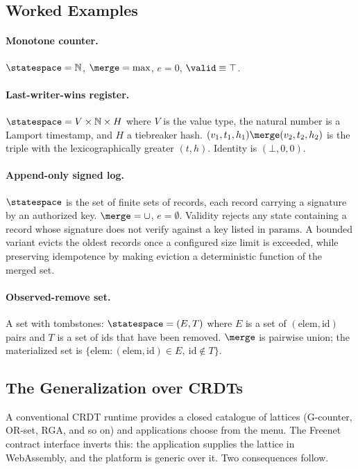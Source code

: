 \subsection{Worked Examples}

\paragraph{Monotone counter.} $\statespace = \mathbb{N}$, $\merge = \max$, $e = 0$, $\valid \equiv \top$.

\paragraph{Last-writer-wins register.} $\statespace = V \times \mathbb{N} \times H$ where $V$ is the value type, the natural number is a Lamport timestamp, and $H$ a tiebreaker hash. $(v_1, t_1, h_1) \merge (v_2, t_2, h_2)$ is the triple with the lexicographically greater $(t, h)$. Identity is $(\bot, 0, 0)$.

\paragraph{Append-only signed log.} $\statespace$ is the set of finite sets of records, each record carrying a signature by an authorized key. $\merge = \cup$, $e = \emptyset$. Validity rejects any state containing a record whose signature does not verify against a key listed in $\mathrm{params}$. A bounded variant evicts the oldest records once a configured size limit is exceeded, while preserving idempotence by making eviction a deterministic function of the merged set.

\paragraph{Observed-remove set.} A set with tombstones: $\statespace = (E, T)$ where $E$ is a set of $(\mathrm{elem}, \mathrm{id})$ pairs and $T$ is a set of $\mathrm{id}$s that have been removed. $\merge$ is pairwise union; the materialized set is $\{\mathrm{elem} : (\mathrm{elem}, \mathrm{id}) \in E,\ \mathrm{id} \notin T\}$.

\subsection{The Generalization over CRDTs}

A conventional CRDT runtime provides a closed catalogue of lattices (G-counter, OR-set, RGA, and so on) and applications choose from the menu. The Freenet contract interface inverts this: the application supplies the lattice in WebAssembly, and the platform is generic over it. Two consequences follow.

